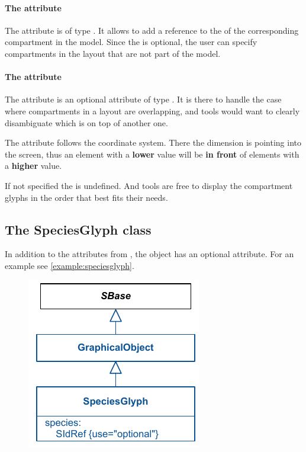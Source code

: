 \paragraph{The  attribute}
The  attribute is of type . It 
allows to add a reference to the  of the corresponding 
compartment in the model. Since the  is optional, the 
user can specify compartments in the layout that are not part of the 
model. 

\paragraph{The  attribute}
The  attribute is an optional attribute of type 
. It is there to handle the case where compartments in a layout are overlapping, and tools would want to clearly disambiguate which \CompartmentGlyph is on top of another one. 

The  attribute follows the coordinate system. There 
the  dimension is pointing into the screen, thus an element 
with a \textbf{lower}  value will be \textbf{in front} of 
elements with a \textbf{higher} value.

If not specified the  is undefined. And tools are free to 
display the compartment glyphs in the order that best fits their needs. 

\subsection{The SpeciesGlyph class}
\label{speciesglyph-class}
In addition to the attributes from \GraphicalObject, the \SpeciesGlyph 
object has an optional  attribute. For an example see \ref{example:speciesglyph}.

\begin{figure}[!h]
\includegraphics{uml/layout-speciesglyph-uml}\\
\label{uml:speciesglyph}
\end{figure}

